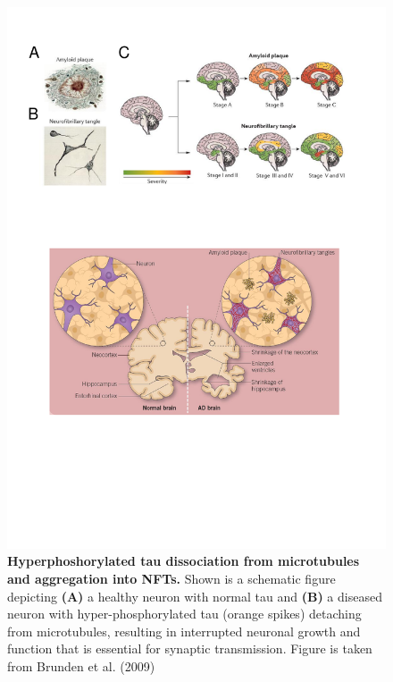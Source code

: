 \begin{figure}[!ht]
	\centering
	\includegraphics[page=13,trim={0 14cm 0cm 0cm},clip, scale = 0.7]{Figures/Introduction_Figures.pdf}
	\captionsetup{width=0.95\textwidth,singlelinecheck=off}
	\caption[Tau tangle hypothesis]%
	{\textbf{Hyperphoshorylated tau dissociation from microtubules and aggregation into NFTs.} Shown is a schematic figure depicting \textbf{(A)} a healthy neuron with normal tau and \textbf{(B)} a diseased neuron with hyper-phosphorylated tau (orange spikes) detaching from microtubules, resulting in interrupted neuronal growth and function that is essential for synaptic transmission. Figure is taken from Brunden et al. (2009)\cite{Brunden2009}
	}
	\label{fig:tau_hypothesis}
\end{figure}	

